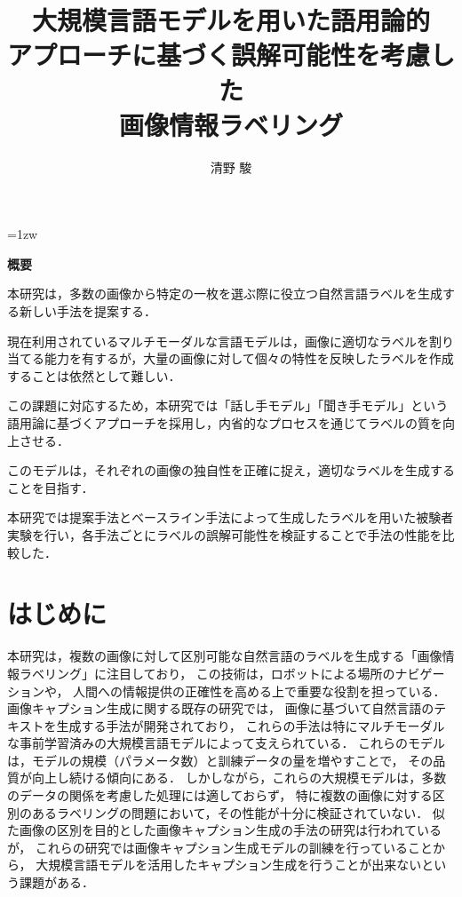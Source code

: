 \documentclass[a4paper,11pt]{jreport}
\title{大規模言語モデルを用いた語用論的\\アプローチに基づく誤解可能性を考慮した\\画像情報ラベリング}
\author{清野 駿}
\begin{document}
\maketitle
\thispagestyle{empty}
\newpage

\thispagestyle{empty}
\vspace*{20pt plus 1fil}
\parindent=1zw
\noindent
\begin{center}
{\bf 概要}
\vspace{5mm}
\end{center}
本研究は，多数の画像から特定の一枚を選ぶ際に役立つ自然言語ラベルを生成する新しい手法を提案する．

現在利用されているマルチモーダルな言語モデルは，画像に適切なラベルを割り当てる能力を有するが，大量の画像に対して個々の特性を反映したラベルを作成することは依然として難しい．

この課題に対応するため，本研究では「話し手モデル」「聞き手モデル」という語用論に基づくアプローチを採用し，内省的なプロセスを通じてラベルの質を向上させる．

このモデルは，それぞれの画像の独自性を正確に捉え，適切なラベルを生成することを目指す．

本研究では提案手法とベースライン手法によって生成したラベルを用いた被験者実験を行い，各手法ごとにラベルの誤解可能性を検証することで手法の性能を比較した．

\par
\vspace{0pt plus 1fil}
\newpage

\tableofcontents
\listoffigures

\pagebreak \setcounter{page}{1}


\chapter{はじめに}

本研究は，複数の画像に対して区別可能な自然言語のラベルを生成する「画像情報ラベリング」に注目しており，
この技術は，ロボットによる場所のナビゲーションや，
人間への情報提供の正確性を高める上で重要な役割を担っている\cite{Yin2023}．
画像キャプション生成に関する既存の研究では，
画像に基づいて自然言語のテキストを生成する手法が開発されており\cite{Farhadi2010, Vinyals2017, Dai2023}，
これらの手法は特にマルチモーダルな事前学習済みの大規模言語モデルによって支えられている．
これらのモデルは，モデルの規模（パラメータ数）と訓練データの量を増やすことで，
その品質が向上し続ける傾向にある\cite{Devlin2019}．
しかしながら，これらの大規模モデルは，多数のデータの関係を考慮した処理には適しておらず，
特に複数の画像に対する区別のあるラベリングの問題において，その性能が十分に検証されていない．
似た画像の区別を目的とした画像キャプション生成の手法の研究は行われている\cite{Vedantam2017,Cohn-Gordon2018,Nie2020,Andreas2016}が，
これらの研究では画像キャプション生成モデルの訓練を行っていることから，
大規模言語モデルを活用したキャプション生成を行うことが出来ないという課題がある．
\end{document}

